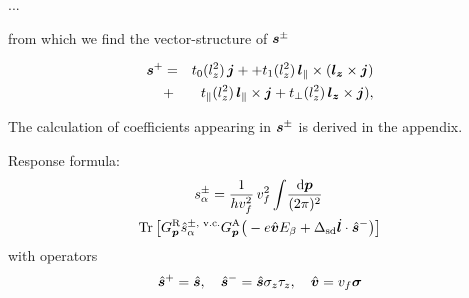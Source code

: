 ...

from which we find the vector-structure of $\boldsymbol{s}^\pm$

\begin{eqnarray}\nonumber
\boldsymbol{s}^+ &=&t_0(l_z^2)\,\bm{j}++t_1(l_z^2)\,\bm{l}_\parallel\times(\bm{l_z}\times\bm{j}) \\ \label{coeff}
&+&t_\parallel(l_z^2)\,\bm{l}_\parallel\times\bm{j} +t_\perp(l_z^2)\,\bm{l_z}\times\bm{j}) ,
\end{eqnarray}

The calculation of coefficients appearing in $\boldsymbol{s}^\pm$ is derived in the appendix. 

Response formula:
\begin{multline}
    s^\pm_\alpha = \frac{1}{hv_f^2}\,v_f^2 
    \int\! \frac{\mathrm{d}\boldsymbol{p}}{(2\pi)^2}\, \\
    \operatorname{Tr} \big[G^\text{R}_{\boldsymbol{p}}\hat{s}^{\pm,\text{ v.c.}}_\alpha G^\text{A}_{\boldsymbol{p}}\big(-e\hat{\boldsymbol{v}}E_\beta+\Delta_\text{sd} \dot{\boldsymbol{l}} \cdot\hat{\boldsymbol{s}}^-\big)\big]
\end{multline}
with operators
\begin{equation}
    \hat{\boldsymbol{s}}^+ = \hat{\boldsymbol{s}}, \quad\hat{\boldsymbol{s}}^- = \hat{\boldsymbol{s}}\sigma_z\tau_z, \quad\hat{\boldsymbol{v}} = v_f\boldsymbol{\sigma} 
\end{equation}
